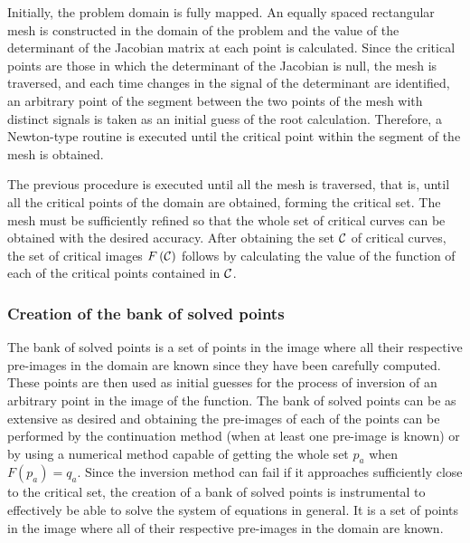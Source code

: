 \documentclass[journal=iecred,manuscript=article]{achemso}
\theoremstyle{definition}
\theoremstyle{remark}
\begin{document}
Initially, the problem domain is fully mapped. An equally spaced rectangular mesh is constructed in the domain of the problem and the value of the determinant of the Jacobian matrix at each point is calculated. Since the critical points are those in which the determinant of the Jacobian is null, the mesh is traversed, and each time changes 
  in the signal of the determinant are identified,
   an arbitrary point of the segment between the two points 
   of the mesh with distinct signals is taken as an initial guess of the root calculation.
    Therefore, a Newton-type routine is executed until the critical point within the segment of the mesh
     is obtained.

The previous procedure is executed until all the mesh is traversed, that is, until all the critical points of the domain are obtained, forming the critical set. 
 The mesh must be sufficiently refined so that the
 whole set of  critical curves can be obtained
  with the desired accuracy. After obtaining the set $ {\cal C} $ of critical curves, the set of critical images 
  $F\left({\cal C}\right) $ follows by calculating the value of the function of each of the critical points contained in $ {\cal C} $.

\subsubsection{Creation of the bank of solved points}
The bank of solved points is a set of points in the image 
where all their respective pre-images in the 
domain are known since they have been carefully 
computed. 
These points are then used as initial guesses for the process 
of inversion of an arbitrary point in the image of the 
function. The bank of solved points can be as extensive as desired and obtaining the pre-images of each of the points can be performed by the continuation method (when at least one
pre-image is known)
 or by using a numerical method capable of getting the whole set $ p_{a} $ when $F\left(p_{a}\right) = q_{a} $.
Since the inversion method can fail if it approaches sufficiently close to the critical set, the  creation of a bank of solved points is instrumental 
 to effectively be able to solve the system of equations
 in general.
  It is a set of points in the image where all of their respective pre-images in the domain are known. 
\end{document}
